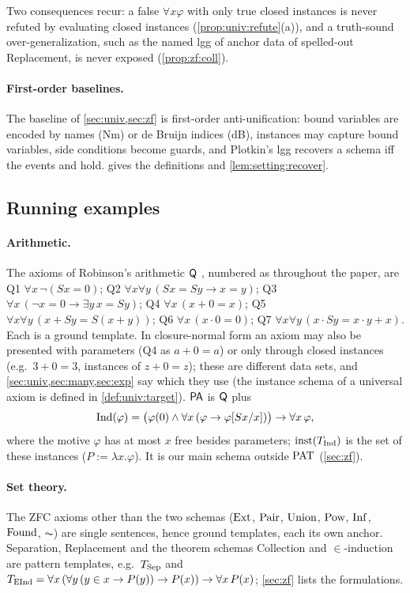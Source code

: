 Two consequences recur: a false $\forall x\varphi$ with only true closed instances is never refuted by evaluating closed instances (\cref{prop:univ:refute}(a)), and a truth-sound over-generalization, such as the named lgg of anchor data of spelled-out Replacement, is never exposed (\cref{prop:zf:coll}).

\paragraph{First-order baselines.}
The baseline of \cref{sec:univ,sec:zf} is first-order anti-unification: bound variables are encoded by names (Nm) or de Bruijn indices (dB), instances may capture bound variables, side conditions become guards, and Plotkin's lgg recovers a schema iff the events \evR{} and \evD{} hold.  gives the definitions and \cref{lem:setting:recover}.

\subsection{Running examples}\label{sec:setting:examples}

\paragraph{Arithmetic.}
The axioms of Robinson's arithmetic $\mathsf{Q}$ \citep{tarski1953undecidable}, numbered as throughout the paper, are Q1 $\forall x\,\neg(Sx=0)$; Q2 $\forall x\forall y\,(Sx=Sy\to x=y)$; Q3 $\forall x\,(\neg x=0\to\exists y\,x=Sy)$; Q4 $\forall x\,(x+0=x)$; Q5 $\forall x\forall y\,(x+Sy=S(x+y))$; Q6 $\forall x\,(x\cdot0=0)$; Q7 $\forall x\forall y\,(x\cdot Sy=x\cdot y+x)$. Each is a ground template. In closure-normal form an axiom may also be presented with parameters (Q4 as $a+0=a$) or only through closed instances (e.g.\ $\num{3}+0=\num{3}$, instances of $z+0=z$); these are different data sets, and \cref{sec:univ,sec:many,sec:exp} say which they use (the instance schema of a universal axiom is defined in \cref{def:univ:target}). $\mathsf{PA}$ is $\mathsf{Q}$ plus
\[\mathrm{Ind}(\varphi)=\bigl(\varphi(0)\wedge\forall x\,(\varphi\to\varphi[Sx/x])\bigr)\to\forall x\,\varphi,\]
where the motive $\varphi$ has at most $x$ free besides parameters; $\mathrm{inst}(T_{\mathrm{Ind}})$ is the set of these instances ($P:=\lambda x.\varphi$). It is our main schema outside $\mathrm{PAT}$ (\cref{sec:zf}).

\paragraph{Set theory.}
The ZFC axioms other than the two schemas ($\mathrm{Ext}$, $\mathrm{Pair}$, $\mathrm{Union}$, $\mathrm{Pow}$, $\mathrm{Inf}$, $\mathrm{Found}$, $\AC$) are single sentences, hence ground templates, each its own anchor. Separation, Replacement and the theorem schemas Collection and $\in$-induction are pattern templates, e.g.\ $T_{\mathrm{Sep}}$ and $T_{\mathrm{EInd}}=\forall x\,(\forall y\,(y\in x\to P(y))\to P(x))\to\forall x\,P(x)$; \cref{sec:zf} lists the formulations.

